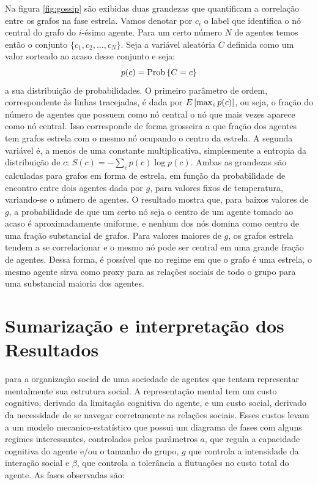 Na figura \ref{fig:gossip} são exibidas duas grandezas que quantificam a correlação entre os grafos na fase estrela. Vamos denotar por $c_i$ o label que identifica o nó central do grafo do $i$-ésimo agente. Para um certo número $N$ de agentes temos então o conjunto $\{c_1, c_2, \ldots, c_N\}$. Seja a variável aleatória $C$ definida como um valor sorteado ao acaso desse conjunto e seja:
\[
 p(c) = \mathrm{Prob}\left\{C = c\right\}
\]
a sua distribuição de probabilidades. O primeiro parâmetro de ordem, correspondente às linhas tracejadas, é dada por $E\left[\max_{c} p(c)\right]$, ou seja, o fração do número de agentes que possuem como nó central o nó que mais vezes aparece como nó central. Isso corresponde de forma grosseira a que fração dos agentes tem grafos estrela com o mesmo nó ocupando o centro da estrela. A segunda variável é, a menos de uma constante multiplicativa, simplesmente a entropia da distribuição de $c$: $S(c) = -\sum_{c} p(c) \log p(c)$. Ambas as grandezas são calculadas para grafos em forma de estrela, em função da probabilidade de encontro entre dois agentes dada por $g$, para valores fixos de temperatura, variando-se o número de agentes. O resultado mostra que, para baixos valores de $g$, a probabilidade de que um certo nó seja o centro de um agente tomado ao acaso é aproximadamente uniforme, e nenhum dos nós domina como centro de uma fração substancial de grafos. Para valores maiores de $g$, os grafos estrela tendem a se correlacionar e o mesmo nó pode ser central em uma grande fração de agentes. Dessa forma, é possível que no regime em que o grafo é uma estrela, o mesmo agente sirva como proxy para as relações sociais de todo o grupo para uma substancial maioria dos agentes.

\section{Sumarização e interpretação dos Resultados}
 para a organização social de uma sociedade de agentes que tentam representar mentalmente sua estrutura social. A representação mental tem um custo cognitivo, derivado da limitação cognitiva do agente, e um custo social, derivado da necessidade de se navegar corretamente as relações sociais. Esses custos levam a um modelo mecanico-estatístico que possui um diagrama de fases com alguns regimes interessantes, controlados pelos parâmetros $a$, que regula a capacidade cognitiva do agente e/ou o tamanho do grupo, $g$ que controla a intensidade da interação social e $\beta$, que controla a tolerância a flutuações no custo total do agente. As fases observadas são:

